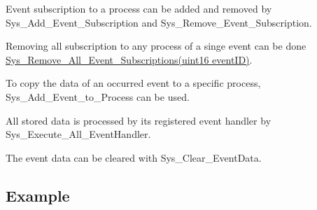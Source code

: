 \begin{DoxyItemize}
\item Event subscription to a process can be added and removed by Sys\+\_\+\+Add\+\_\+\+Event\+\_\+\+Subscription and Sys\+\_\+\+Remove\+\_\+\+Event\+\_\+\+Subscription.
\item Removing all subscription to any process of a singe event can be done \hyperlink{process__Management_8h_a67190fffc18b7864f1cdc6813c944738}{Sys\+\_\+\+Remove\+\_\+\+All\+\_\+\+Event\+\_\+\+Subscriptions(uint16 event\+I\+D)}.
\item To copy the data of an occurred event to a specific process, Sys\+\_\+\+Add\+\_\+\+Event\+\_\+to\+\_\+\+Process can be used.
\item All stored data is processed by its registered event handler by Sys\+\_\+\+Execute\+\_\+\+All\+\_\+\+Event\+Handler.
\item The event data can be cleared with Sys\+\_\+\+Clear\+\_\+\+Event\+Data.
\end{DoxyItemize}\hypertarget{group__process_process_example}{}\subsection{Example}\label{group__process_process_example}


